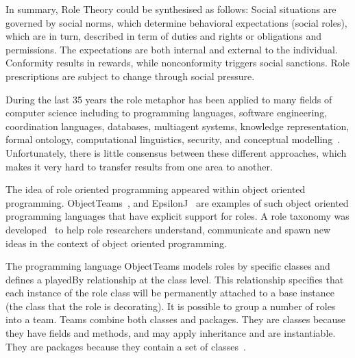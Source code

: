\documentclass[a4paper,12pt,oneside,fleqn]{book} %
\newcommand{\todo}[1]{[\textcolor{red}{TODO}: #1]}
\begin{document}
In summary, Role Theory could be synthesised as follows: Social situations
are governed by social norms, which determine behavioral
expectations (social roles), which are in turn, described in term of duties
and rights or obligations and permissions. The expectations are both
internal and external to the individual. Conformity results in rewards,
while nonconformity triggers social sanctions. Role prescriptions are
subject to change through social pressure.

During the last 35 years the role metaphor has been applied to many fields
of computer science including to programming languages, software
engineering, coordination languages, databases, multiagent systems,
knowledge representation, formal ontology, computational linguistics,
security, and conceptual modelling~\cite{DBLP:journals/ao/BoellaTV07}.
Unfortunately, there is little consensus between these different approaches,
which makes it very hard to transfer results from one area to another.

The idea of role oriented programming appeared within object
oriented programming.  ObjectTeams~\cite{DBLP:journals/ao/Herrmann07}, and
EpsilonJ~\cite{DBLP:conf/snpd/MonpratarnchaiT08} are examples of such
object oriented programming languages that have explicit support for roles.
A role taxonomy was developed~\cite{graversen06nature} to help role
researchers understand, communicate and spawn new ideas in the
context of object oriented programming.



The programming language ObjectTeams models roles by specific classes and
defines a playedBy relationship at the class level. This relationship
specifies that each instance of the role class will be permanently attached
to a base instance (the class that the role is decorating). It is possible
to group a number of roles into a team.  Teams combine both
classes and packages. They are classes because they have fields and
methods, and may apply inheritance and are instantiable. They are packages
because they contain a set of classes~\cite{DBLP:journals/ao/Herrmann07}.
\end{document}

